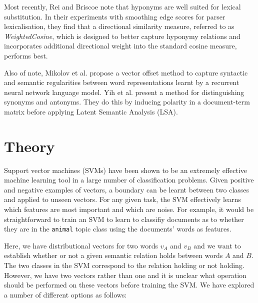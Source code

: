 \documentclass[11pt]{article}
\begin{document}
Most recently, Rei and Briscoe  note that hyponyms are well suited for lexical substitution.  In their experiments with smoothing edge scores for parser lexicalisation, they find that a directional similarity measure, referred to as \emph{WeightedCosine}, which is designed to better capture hyponymy relations and incorporates additional directional weight into the standard cosine measure, performs best.

Also of note, Mikolov et al.  propose a vector offset method to capture syntactic and semantic regularities between word representations learnt by a recurrent neural network language model.  Yih et al.  present a method for distinguishing synonyms and antonyms.  They do this by inducing polarity in a document-term matrix before applying Latent Semantic Analysis (LSA).

\section{Theory}
\label{sect:theory}
Support vector machines (SVMs) have been shown to be an extremely effective machine learning tool in a large number of classification problems.  Given positive and negative examples of vectors, a boundary can be learnt between two classes and applied to unseen vectors.  For any given task, the SVM effectively learns which features are most important and which are noise.  For example, it would be straightforward to train an SVM to learn to classifiy documents as to whether they are in the \texttt{animal} topic class using the documents' words as features.     

Here, we have distributional vectors for two words $v_A$ and $v_B$ and we want to establish whether or not a given semantic relation holds between words $A$ and $B$. The two classes in the SVM correspond to the relation holding or not holding.  However, we have two vectors rather than one and it is unclear what operation should be performed on these vectors before training the SVM.  We have explored a number of different options as follows:
\end{document}
